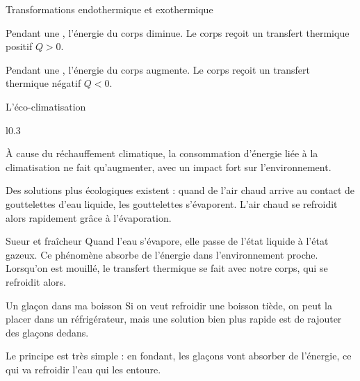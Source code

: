 \begin{doc}{Transformations endothermique et exothermique}
  \vspace*{-20pt}
  \begin{encart}
    \begin{listePoints}
      \item Pendant une , l'énergie du corps diminue. 
      Le corps reçoit un transfert thermique positif $Q > 0$.
      \item Pendant une , l'énergie du corps augmente.
      Le corps reçoit un transfert thermique négatif $Q < 0$.
    \end{listePoints}
  \end{encart}
\end{doc}


\begin{doc}{L'éco-climatisation}
  \label{doc:climatisation}
  \vspace*{-18pt}
  \begin{wrapfigure}{l}{0.3\linewidth}
    \vspace*{-15pt}
    \centering
  \end{wrapfigure}
  À cause du réchauffement climatique, la consommation d'énergie liée à la climatisation ne fait qu'augmenter, avec un impact fort sur l'environnement.
  
  Des solutions plus écologiques existent : quand de l'air chaud arrive au contact de gouttelettes d'eau liquide, les gouttelettes s'évaporent.
  L'air chaud se refroidit alors rapidement grâce à l'évaporation.
\end{doc}

\begin{doc}{Sueur et fraîcheur}
  \label{doc:evaporation}
  Quand l'eau s'évapore, elle passe de l'état liquide à l'état gazeux.
  Ce phénomène absorbe de l'énergie dans l'environnement proche.
  Lorsqu'on est mouillé, le transfert thermique se fait avec notre corps, qui se refroidit alors.
\end{doc}

\begin{doc}{Un glaçon dans ma boisson}
  \label{doc:glacons}
  Si on veut refroidir une boisson tiède, on peut la placer dans un réfrigérateur, mais une solution bien plus rapide est de rajouter des glaçons dedans.
  
  Le principe est très simple : en fondant, les glaçons vont absorber de l'énergie, ce qui va refroidir l'eau qui les entoure.
\end{doc}




